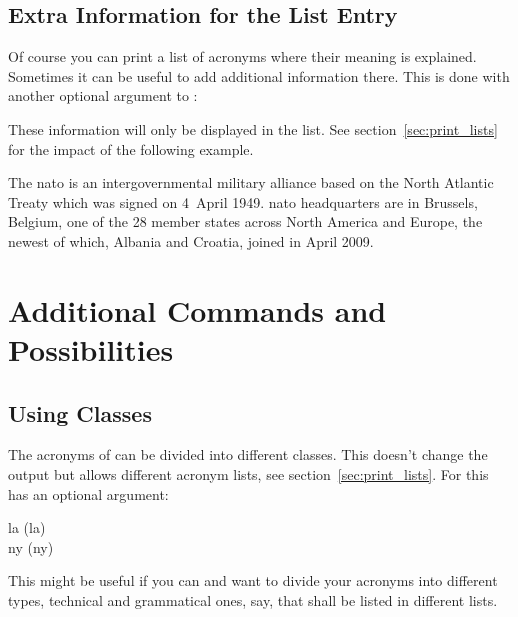 \documentclass[DIV10,toc=index,toc=bib,hyperfootnotes=false]{cnpkgdoc}
\begin{document}
\subsection{Extra Information for the List Entry}
Of course you can print a list of acronyms where their meaning is explained.
Sometimes it can be useful to add additional information there. This is done with
another optional argument to :
\begin{beschreibung}
\end{beschreibung}
These information will only be displayed in the list. See section~\ref{sec:print_lists}
for the impact of the following example.

\begin{beispiel}
 The \ac{nato} is an intergovernmental military alliance based on the
 North Atlantic Treaty which was signed on 4~April 1949. \ac{nato}
 headquarters are in Brussels, Belgium, one of the 28 member states
 across North America and Europe, the newest of which, Albania and
 Croatia, joined in April 2009.
\end{beispiel}

\section{Additional Commands and Possibilities}
\subsection{Using Classes}
The acronyms of \acro can be divided into different classes. This doesn't change
the output but allows different acronym lists, see section~\ref{sec:print_lists}.
For this  has an optional argument:
\begin{beschreibung}
\end{beschreibung}
\begin{beispiel}
 \acl{la} (\acs{la}) \\
 \acl{ny} (\acs{ny})
\end{beispiel}
This might be useful if you can and want to divide your acronyms into different
types, technical and grammatical ones, say, that shall be listed in different
lists.
\end{document}
